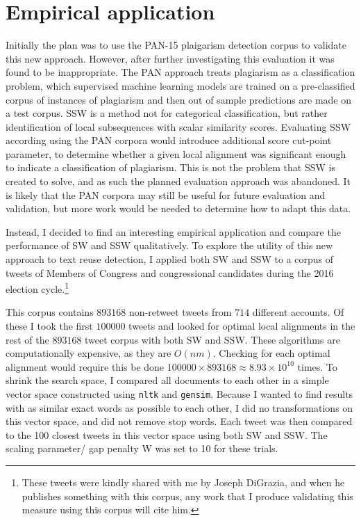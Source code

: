 \section{Empirical application}
Initially the plan was to use the PAN-15 plaigarism detection corpus to validate this new approach\cite{potthast2010evaluation}. However, after further investigating this evaluation it was found to be inappropriate. The PAN approach treats plagiarism as a classification problem, which supervised machine learning models are trained on a pre-classified corpus of instances of plagiarism and then out of sample predictions are made on a test corpus. SSW is a method not for categorical classification, but rather identification of local subsequences with scalar similarity scores. Evaluating SSW according using the PAN corpora would introduce additional score cut-point parameter, to determine whether a given local alignment was significant enough to indicate a classification of plagiarism. This is not the problem that SSW is created to solve, and as such the planned evaluation approach was abandoned. It is likely that the PAN corpora may still be useful for future evaluation and validation, but more work would be needed to determine how to adapt this data.

Instead, I decided to find an interesting empirical application and compare the performance of SW and SSW qualitatively. To explore the utility of this new approach to text reuse detection, I applied both SW and SSW to a corpus of tweets of Members of Congress and congressional candidates during the 2016 election cycle.\footnote{These tweets were kindly shared with me by Joseph DiGrazia, and when he publishes something with this corpus, any work that I produce validating this measure using this corpus will cite him.}

This corpus contains $893168$ non-retweet tweets from $714$ different accounts. Of these I took the first $100000$ tweets and looked for optimal local alignments in the rest of the $893168$ tweet corpus with both SW and SSW. These algorithms are computationally expensive, as they are $O(nm)$. Checking for each optimal alignment would require this be done $100000 \times 893168 \approx 8.93 \times 10^{10}$ times. To shrink the search space, I compared all documents to each other in a simple vector space constructed using \texttt{nltk} and \texttt{gensim}. Because I wanted to find results with as similar exact words as possible to each other, I did no transformations on this vector space, and did not remove stop words. Each tweet was then compared to the 100 closest tweets in this vector space using both SW and SSW. The scaling parameter/ gap penalty W was set to 10 for these trials.

